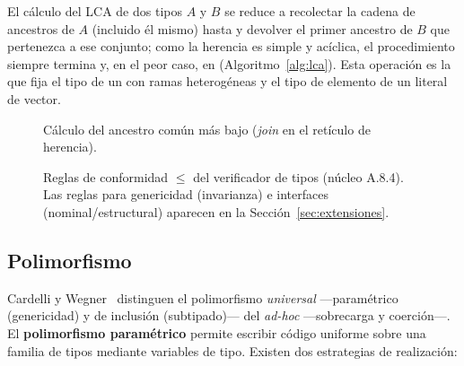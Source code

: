 \documentclass[14pts,runningheads,a4paper]{llncs}
\newcommand{\code}[1]{\texttt{\detokenize{#1}}}
\begin{document}
El c\'alculo del LCA de dos tipos $A$ y $B$ se reduce a recolectar la cadena de
ancestros de $A$ (incluido \'el mismo) hasta \code{Object} y devolver el primer
ancestro de $B$ que pertenezca a ese conjunto; como la herencia es simple y
ac\'iclica, el procedimiento siempre termina y, en el peor caso, en \code{Object}
(Algoritmo~\ref{alg:lca}). Esta operaci\'on es la que fija el tipo de un \code{if} con
ramas heterog\'eneas y el tipo de elemento de un literal de vector.

\begin{figure}[tbp]
\centering
{}
\caption{C\'alculo del ancestro com\'un m\'as bajo (\emph{join} en el ret\'iculo de
herencia).}
\label{fig:lca}
\end{figure}

\begin{figure}[tbp]
\centering
{}
\caption{Reglas de conformidad $\leq$ del verificador de tipos (n\'ucleo A.8.4).
Las reglas para genericidad (invarianza) e interfaces (nominal/estructural) aparecen
en la Secci\'on~\ref{sec:extensiones}.}
\label{fig:reglas}
\end{figure}

\subsection{Polimorfismo}

Cardelli y Wegner~\cite{cardelli1985understanding} distinguen el polimorfismo
\emph{universal} ---param\'etrico (genericidad) y de inclusi\'on (subtipado)--- del
\emph{ad-hoc} ---sobrecarga y coerci\'on---. El \textbf{polimorfismo param\'etrico}
permite escribir c\'odigo uniforme sobre una familia de tipos mediante variables de
tipo. Existen dos estrategias de realizaci\'on:
\end{document}
